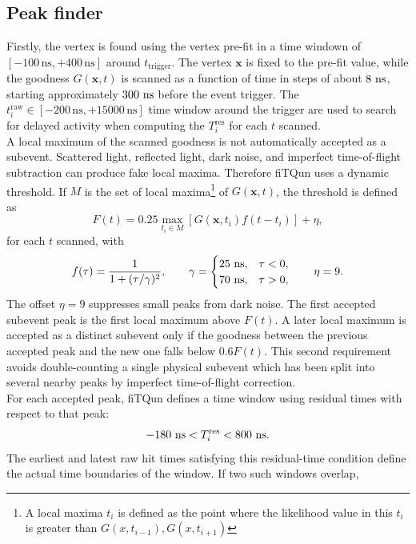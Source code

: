 \documentclass{article}
\numberwithin{table}{subsection}
\numberwithin{figure}{subsection}
\numberwithin{equation}{subsection}
\numberwithin{footnote}{subsection}
\begin{document}
\subsection{Peak finder}
Firstly, the vertex is found using the vertex pre-fit in a time windown of $\left[-100\,\mathrm{ns}, +400\,\mathrm{ns}\right]$ around $t_\mathrm{trigger}$. The vertex \(\mathbf{x}\) is fixed to the pre-fit value, while the 
goodness \(G(\mathbf{x},t)\) is scanned as a function of time in steps of about \(8~{\rm ns}\), starting approximately \(300~{\rm ns}\) before the event trigger. The $t_i^\mathrm{raw}\in\left[-200\,\mathrm{ns}, +15000\,\mathrm{ns}\right]$ time window around the trigger are used to search for delayed activity when computing the $T_i^\mathrm{res}$ for each $t$ scanned.\\
\newline
A local maximum of the scanned goodness is not automatically accepted as a
subevent. Scattered light, reflected light, dark noise, and imperfect
time-of-flight subtraction can produce fake local maxima. Therefore fiTQun
uses a dynamic threshold. If \(M\) is the set of local maxima\footnote{A local maxima $t_i$ is defined as the point where the likelihood value in this $t_i$ is greater than $G(x, t_{i-1}), G(x, t_{i+1})$} of
\(G(\mathbf{x},t)\), the threshold is defined as
\[
  F(t)
  =
  0.25
  \max_{t_i \in M}
  \left[
    G(\mathbf{x},t_i)
    f(t-t_i)
  \right]
  + \eta ,
\]
for each $t$ scanned,
with
\[
  f(\tau)
  =
  \frac{1}{1+(\tau/\gamma)^2},
  \qquad
  \gamma =
  \begin{cases}
    25~{\rm ns}, & \tau < 0, \\
    70~{\rm ns}, & \tau > 0,
  \end{cases}
  \qquad
  \eta = 9 .
\]
The offset \(\eta=9\) suppresses small peaks from dark noise. The first
accepted subevent peak is the first local maximum above \(F(t)\). A later
local maximum is accepted as a distinct subevent only if the goodness between
the previous accepted peak and the new one falls below \(0.6F(t)\). This
second requirement avoids double-counting a single physical subevent which
has been split into several nearby peaks by imperfect time-of-flight
correction.\\
\newline
For each accepted peak, fiTQun defines a time window using residual times
with respect to that peak:
\[
  -180~{\rm ns}
  <
  T_i^{\rm res}
  <
  800~{\rm ns}.
\]
The earliest and latest raw hit times satisfying this residual-time condition
define the actual time boundaries of the window. If two such windows overlap,
\end{document}
